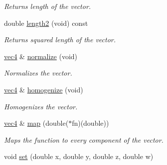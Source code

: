 \begin{DoxyCompactItemize}
\begin{DoxyCompactList}\small\item\em \-Returns length of the vector. \end{DoxyCompactList}\item 
\hypertarget{classutil_1_1math_1_1vec4_ad6cd19f246bcc0b676d29f77d527b04a}{double \hyperlink{classutil_1_1math_1_1vec4_ad6cd19f246bcc0b676d29f77d527b04a}{length2} (void) const }\label{classutil_1_1math_1_1vec4_ad6cd19f246bcc0b676d29f77d527b04a}

\begin{DoxyCompactList}\small\item\em \-Returns squared length of the vector. \end{DoxyCompactList}\item 
\hypertarget{classutil_1_1math_1_1vec4_aea1190390e3011ad873afdb55bfe0f66}{\hyperlink{classutil_1_1math_1_1vec4}{vec4} \& \hyperlink{classutil_1_1math_1_1vec4_aea1190390e3011ad873afdb55bfe0f66}{normalize} (void)}\label{classutil_1_1math_1_1vec4_aea1190390e3011ad873afdb55bfe0f66}

\begin{DoxyCompactList}\small\item\em \-Normalizes the vector. \end{DoxyCompactList}\item 
\hypertarget{classutil_1_1math_1_1vec4_ad5c4d87a9801e7debc753690283d8d28}{\hyperlink{classutil_1_1math_1_1vec4}{vec4} \& \hyperlink{classutil_1_1math_1_1vec4_ad5c4d87a9801e7debc753690283d8d28}{homogenize} (void)}\label{classutil_1_1math_1_1vec4_ad5c4d87a9801e7debc753690283d8d28}

\begin{DoxyCompactList}\small\item\em \-Homogenizes the vector. \end{DoxyCompactList}\item 
\hypertarget{classutil_1_1math_1_1vec4_a4fb1c7573030c17d372e7024b4e3805d}{\hyperlink{classutil_1_1math_1_1vec4}{vec4} \& \hyperlink{classutil_1_1math_1_1vec4_a4fb1c7573030c17d372e7024b4e3805d}{map} (double($\ast$fn)(double))}\label{classutil_1_1math_1_1vec4_a4fb1c7573030c17d372e7024b4e3805d}

\begin{DoxyCompactList}\small\item\em \-Maps the function to every component of the vector. \end{DoxyCompactList}\item 
\hypertarget{classutil_1_1math_1_1vec4_a52c4a4619a0cf7ae394bf66eb60c5f25}{void \hyperlink{classutil_1_1math_1_1vec4_a52c4a4619a0cf7ae394bf66eb60c5f25}{set} (double x, double y, double z, double w)}\label{classutil_1_1math_1_1vec4_a52c4a4619a0cf7ae394bf66eb60c5f25}


\end{DoxyCompactItemize}
